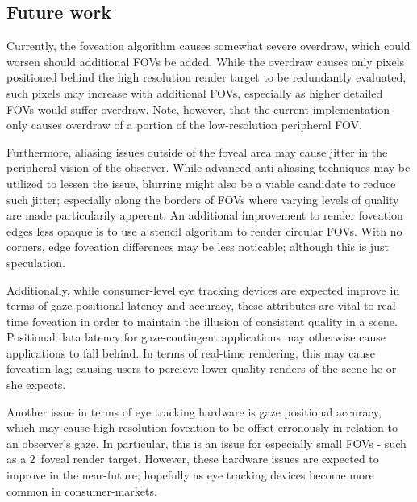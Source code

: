 \subsection{Future work}
Currently, the foveation algorithm causes somewhat severe overdraw, which could worsen should additional FOVs be added.
While the overdraw causes only pixels positioned behind the high resolution render target to be redundantly evaluated, such pixels may increase with additional FOVs, especially as higher detailed FOVs would suffer overdraw.
Note, however, that the current implementation only causes overdraw of a portion of the low-resolution peripheral FOV.

Furthermore, aliasing issues outside of the foveal area may cause jitter in the peripheral vision of the observer.
While advanced anti-aliasing techniques may be utilized to lessen the issue, blurring might also be a viable candidate to reduce such jitter; especially along the borders of FOVs where varying levels of quality are made particularily apperent.
An additional improvement to render foveation edges less opaque is to use a stencil algorithm to render circular FOVs.
With no corners, edge foveation differences may be less noticable; although this is just speculation.

Additionally, while consumer-level eye tracking devices are expected improve in terms of gaze positional latency and accuracy, these attributes are vital to real-time foveation in order to maintain the illusion of consistent quality in a scene.
Positional data latency for gaze-contingent applications may otherwise cause applications to fall behind.
In terms of real-time rendering, this may cause foveation lag; causing users to percieve lower quality renders of the scene he or she expects.

Another issue in terms of eye tracking hardware is gaze positional accuracy, which may cause high-resolution foveation to be offset erronously in relation to an observer's gaze.
In particular, this is an issue for especially small FOVs - such as a $2$\degree\ foveal render target.
However, these hardware issues are expected to improve in the near-future; hopefully as eye tracking devices become more common in consumer-markets.

